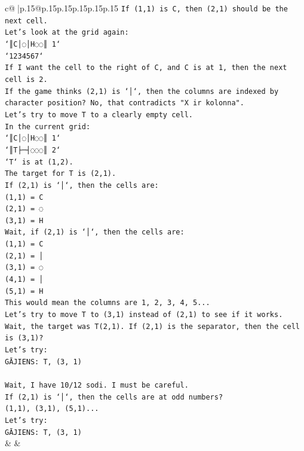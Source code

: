 \documentclass{article}
\begin{document}
{\begin{supertabular}{c@{$\;$}|p{.15\linewidth}@{}p{.15\linewidth}p{.15\linewidth}p{.15\linewidth}p{.15\linewidth}p{.15\linewidth}}
{{{\texttt{If (1,1) is C, then (2,1) should be the next cell.} \\
\texttt{Let's look at the grid again:} \\
\texttt{`║C│◌│H◌◌║ 1`} \\
\texttt{`1234567`} \\
\texttt{If I want the cell to the right of C, and C is at 1, then the next cell is 2.} \\
\texttt{If the game thinks (2,1) is `│`, then the columns are indexed by character position? No, that contradicts "X ir kolonna".} \\
\texttt{Let's try to move T to a clearly empty cell.} \\
\texttt{In the current grid:} \\
\texttt{`║C│◌│H◌◌║ 1`} \\
\texttt{`║T├─┤◌◌◌║ 2`} \\
\texttt{`T` is at (1,2).} \\
\texttt{The target for T is (2,1).} \\
\texttt{If (2,1) is `│`, then the cells are:} \\
\texttt{(1,1) = C} \\
\texttt{(2,1) = ◌} \\
\texttt{(3,1) = H} \\
\texttt{Wait, if (2,1) is `│`, then the cells are:} \\
\texttt{(1,1) = C} \\
\texttt{(2,1) = │} \\
\texttt{(3,1) = ◌} \\
\texttt{(4,1) = │} \\
\texttt{(5,1) = H} \\
\texttt{This would mean the columns are 1, 2, 3, 4, 5...} \\
\texttt{Let's try to move T to (3,1) instead of (2,1) to see if it works.} \\
\texttt{Wait, the target was T(2,1). If (2,1) is the separator, then the cell is (3,1)?} \\
\texttt{Let's try:} \\
\texttt{GĀJIENS: T, (3, 1)} \\
\\ 
\texttt{Wait, I have 10/12 sodi. I must be careful.} \\
\texttt{If (2,1) is `│`, then the cells are at odd numbers?} \\
\texttt{(1,1), (3,1), (5,1)...} \\
\texttt{Let's try:} \\
\texttt{GĀJIENS: T, (3, 1)} \\
            }
        }
    }
    & & \\ \\


\end{supertabular}}
\end{document}
